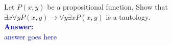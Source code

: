 \item{}
Let $P(x,y)$ be a propositional function. Show that $\exists x\forall yP(x,y)
\to \forall y\exists xP(x,y)$ is a tautology.\\[12pt]
\ifanswers
\textcolor{blue}{
\textbf{Answer:}\\[6pt]
answer goes here
}
\newpage
\fi
